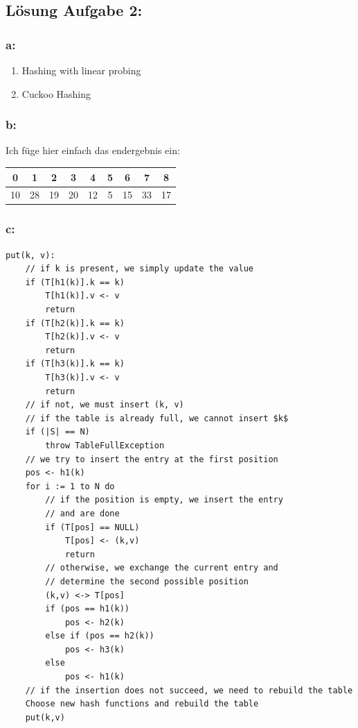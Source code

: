 \documentclass[a4paper,twoside,12pt]{article}
\begin{document}
\begin{description}
\newpage
\subsection*{Lösung Aufgabe 2:}
\subsubsection*{a:}
\begin{enumerate}
	\item Hashing with linear probing
	\item Cuckoo Hashing
\end{enumerate}

\subsubsection*{b:}
Ich füge hier einfach das endergebnis ein:
\begin{center}
\begin{tabular}{|c|c|c|c|c|c|c|c|c|}
	\hline
	0 & 1 & 2 & 3 & 4 & 5 & 6 & 7 & 8 \\
	\hline
	10 & 28 & 19 & 20 & 12 & 5 & 15 & 33 & 17 \\
	\hline
\end{tabular}

\end{center}

\subsubsection*{c:}

\begin{verbatim}
put(k, v):
	// if k is present, we simply update the value
	if (T[h1(k)].k == k)
		T[h1(k)].v <- v
		return
	if (T[h2(k)].k == k)
		T[h2(k)].v <- v
		return
	if (T[h3(k)].k == k)
		T[h3(k)].v <- v
		return
	// if not, we must insert (k, v)
	// if the table is already full, we cannot insert $k$
	if (|S| == N)
		throw TableFullException
	// we try to insert the entry at the first position
	pos <- h1(k)
	for i := 1 to N do
		// if the position is empty, we insert the entry
		// and are done
		if (T[pos] == NULL)
			T[pos] <- (k,v)
			return
		// otherwise, we exchange the current entry and
		// determine the second possible position
		(k,v) <-> T[pos]
		if (pos == h1(k))
			pos <- h2(k)
		else if (pos == h2(k))
			pos <- h3(k)
		else
			pos <- h1(k)
	// if the insertion does not succeed, we need to rebuild the table
	Choose new hash functions and rebuild the table
	put(k,v)
\end{verbatim}



\end{description}
\end{document}
